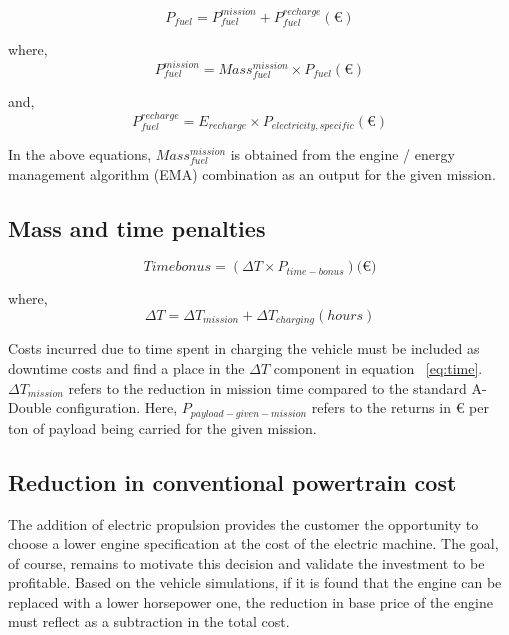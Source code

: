 \documentclass[ExampleMasters.tex]{subfiles}
\begin{document}
			\begin{equation}
				P_{fuel} = P_{fuel}^{mission}+P_{fuel}^{recharge} (\euro{})
			\end{equation}

			where,
			\begin{equation}
				P_{fuel}^{mission} = Mass_{fuel}^{mission} \times P_{fuel} (\euro{})
			\end{equation}

			and,
			\begin{equation}
				P_{fuel}^{recharge} = E_{recharge} \times P_{electricity, specific} (\euro{})
			\end{equation}

			In the above equations, $Mass_{fuel}^{mission}$ is obtained from the engine / energy management algorithm (EMA) combination as an output for the given mission.

		\subsection{Mass and time penalties}

			\begin{equation} \label{eq:time}
				Time bonus = (\Delta T \times P_{time-bonus}) (\euro{)}
			\end{equation}

			where,
			\begin{equation}
				\Delta T = \Delta T_{mission}+\Delta T_{charging} (hours)
			\end{equation}

			Costs incurred due to time spent in charging the vehicle must be included as downtime costs and find a place in the $\Delta T$ component in equation ~\ref{eq:time}. $\Delta T_{mission}$ refers to the reduction in mission time compared to the standard A-Double configuration. Here, $P_{payload-given-mission}$ refers to the returns in \euro{} per ton of payload being carried for the given mission. 

		\subsection{Reduction in conventional powertrain cost}
			The addition of electric propulsion provides the customer the opportunity to choose a lower engine specification at the cost of the electric machine. The goal, of course, remains to motivate this decision and validate the investment to be profitable. Based on the vehicle simulations, if it is found that the engine can be replaced with a lower horsepower one, the reduction in base price of the engine must reflect as a subtraction in the total cost.
\end{document}
